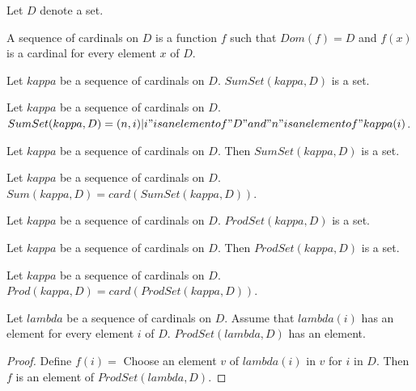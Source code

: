\documentclass{document}
\begin{document}
  \begin{forthel}
    Let $D$ denote a set.

    \begin{definition}
      A sequence of cardinals on $D$ is a function $f$ such that $Dom(f) = D$ and $f(x)$ is a cardinal for every element $x$ of $D$.
    \end{definition}

    \begin{signature}
      Let $kappa$ be a sequence of cardinals on $D$. $SumSet(kappa,D)$ is a set.
    \end{signature}

    \begin{axiom}
      Let $kappa$ be a sequence of cardinals on $D$. $SumSet(kappa,D) = {(n,i) | i "is an element of" D "and" n "is an element of" kappa(i)}$.
    \end{axiom}

    \begin{axiom}
      Let $kappa$ be a sequence of cardinals on $D$. Then $SumSet(kappa,D)$ is a set.
    \end{axiom}

    \begin{definition}
      Let $kappa$ be a sequence of cardinals on $D$. $Sum(kappa,D) = card(SumSet(kappa,D))$.
    \end{definition}

    \begin{signature}
      Let $kappa$ be a sequence of cardinals on $D$. $ProdSet(kappa,D)$ is a set.
    \end{signature}

    \begin{axiom}[Prod_Def)
      Let $kappa$ be a sequence of cardinals on $D$. $ProdSet(kappa,D) = {"function" f | Dom(f) = D /\ (f(i) "is an element of" kappa(i) "for every
      element" i "of" D)}$.
    \end{axiom}

    \begin{axiom}
      Let $kappa$ be a sequence of cardinals on $D$. Then $ProdSet(kappa,D)$ is a set.
    \end{axiom}

    \begin{definition}
      Let $kappa$ be a sequence of cardinals on $D$. $Prod(kappa,D) = card(ProdSet(kappa,D))$.
    \end{definition}


    \begin{lemma}[Choice]
      Let $lambda$ be a sequence of cardinals on $D$. Assume that $lambda(i)$ has an element for every element $i$ of $D$. $ProdSet(lambda, D)$ has an element.
    \end{lemma}
    \begin{proof}
      Define $f(i) =$ Choose an element $v$ of $lambda(i)$ in $v$ for $i$ in $D$. Then $f$ is an element of $ProdSet(lambda,D)$.
    \end{proof}
  \end{forthel}
\end{document}
